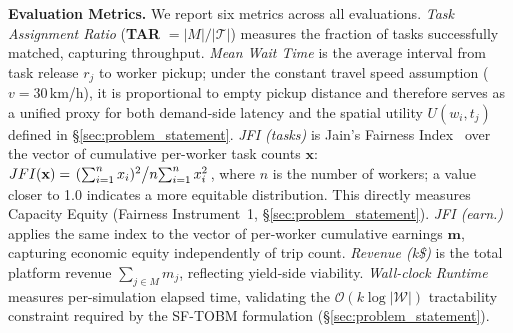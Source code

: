 

\textbf{Evaluation Metrics.}
We report six metrics across all evaluations.
\textit{Task Assignment Ratio} (\textbf{TAR} $= |M|/|\mathcal{T}|$) measures the fraction of tasks successfully matched, capturing throughput.
\textit{Mean Wait Time} is the average interval from task release $r_j$ to worker pickup; under the constant travel speed assumption ($v{=}30$\,km/h), it is proportional to empty pickup distance and therefore serves as a unified proxy for both demand-side latency and the spatial utility $U(w_i, t_j)$ defined in §\ref{sec:problem_statement}.
\textit{JFI (tasks)} is Jain's Fairness Index~\cite{JFI-Original} over the vector of cumulative per-worker task counts $\mathbf{x}$:
$JFI(\mathbf{x}) = \left.{(\sum_{i=1}^{n} x_i)^2} \middle/ n{\sum_{i=1}^{n} x_i^2} \right.$,
where $n$ is the number of workers; a value closer to 1.0 indicates a more equitable distribution. This directly measures Capacity Equity (Fairness Instrument~1, §\ref{sec:problem_statement}).
\textit{JFI (earn.)} applies the same index to the vector of per-worker cumulative earnings $\mathbf{m}$, capturing economic equity independently of trip count.
\textit{Revenue (k\$)} is the total platform revenue $\sum_{j \in M} m_j$, reflecting yield-side viability.
\textit{Wall-clock Runtime} measures per-simulation elapsed time, validating the $\mathcal{O}(k \log |\mathcal{W}|)$ tractability constraint required by the SF-TOBM formulation (§\ref{sec:problem_statement}).

